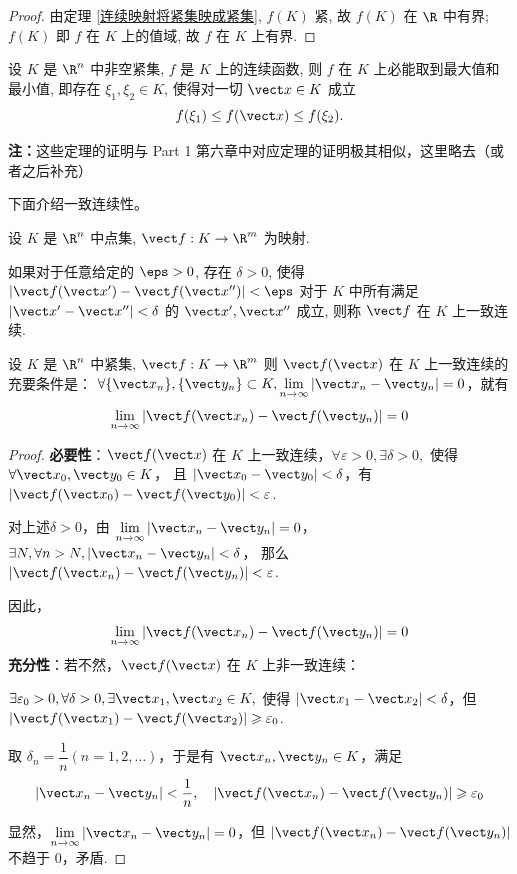 \begin{proof}
	由定理 \ref{连续映射将紧集映成紧集}, $f(K)$ 紧, 故 $f(K)$ 在 $\R$ 中有界; $f(K)$ 即 $f$ 在 $K$ 上的值域, 故 $f$ 在 $K$ 上有界.
\end{proof}

\begin{theorem}[最值定理]
	设 $K$ 是 $\R^n$ 中非空紧集, $f$ 是 $K$ 上的连续函数, 则 $f$ 在 $K$ 上必能取到最大值和最小值, 即存在 $\xi_1, \xi_2 \in K$, 使得对一切 $\vect x \in K$ 成立
	\[
	f(\xi_1) \le f(\vect x) \le f(\xi_2).
	\]
\end{theorem}
\textbf{注：}这些定理的证明与 Part 1 第六章中对应定理的证明极其相似，这里略去（或者之后补充）

下面介绍一致连续性。
\begin{definition}
	设 $K$ 是 $\R^n$ 中点集, $\vect f: K \to \R^m$ 为映射. 
	
	如果对于任意给定的 $\eps > 0$, 存在 $\delta > 0$, 使得 $|\vect f(\vect x') - \vect f(\vect x'')| < \eps$ 对于 $K$ 中所有满足 $|\vect x' - \vect x''| < \delta$ 的 $\vect x', \vect x''$ 成立, 则称 $\vect f$ 在 $K$ 上一致连续.
\end{definition}
\begin{lemma}
	设 $K$ 是 $\R^n$ 中紧集, $\vect f: K \to \R^m$ 则 \( \vect f(\vect x) \) 在 \(K\) 上一致连续的充要条件是：
	\(\forall \{\vect x_n\}, \{\vect y_n\} \subset K, \lim\limits_{n \to \infty} |\vect x_n - \vect y_n| = 0\)，就有
	\[ \lim_{n \to \infty} |\vect f(\vect x_n) - \vect f(\vect y_n) |= 0 \]
	
	
\end{lemma}
\begin{proof}
	\textbf{必要性}：\( \vect f(\vect x) \) 在 \(K\)  上一致连续，\(\forall \varepsilon > 0, \exists \delta > 0, \) 使得 \(\forall \vect x_0, \vect y_0 \in K\)，
	且 \(|\vect x_0 - \vect y_0| < \delta\)，有 \(|\vect f(\vect x_0) - \vect f(\vect y_0)| < \varepsilon\).
	
	对上述\(\delta > 0\)，由 \(\lim\limits_{n \to \infty} |\vect x_n - \vect y_n|= 0\)，\(\exists N, \forall n > N, |\vect x_n - \vect y_n| < \delta\)，
	那么 \( |\vect  f(\vect x_n) -\vect f(\vect y_n)| < \varepsilon\).
	
	因此，\[\lim_{n \to \infty} |\vect  f(\vect x_n) -\vect f(\vect y_n)| = 0\]
\textbf{	充分性}：若不然，\(\vect f(\vect x)\) 在 \(K\) 上非一致连续：
	
	\(\exists \varepsilon_0 > 0, \forall \delta > 0, \exists \vect x_1, \vect x_2 \in K, \) 使得 \(|\vect x_1 - \vect x_2| < \delta\)，但 \(|\vect f(\vect x_1) - \vect f(\vect x_2)| \geqslant \varepsilon_0\).
	
	取 \(\delta_n = \dfrac{1}{n} (n = 1, 2, \dots)\)，于是有 \(\vect x_n, \vect y_n \in K\)，满足
	\[ |\vect x_n - \vect y_n| < \frac{1}{n}, \quad  |\vect  f(\vect x_n) -\vect f(\vect y_n)| \geqslant \varepsilon_0 \]
	
	显然，\(\lim\limits_{n \to \infty} |\vect x_n - \vect y_n| = 0\)，但 $|\vect f(\vect x_n)-\vect f(\vect y_n)|$ 不趋于 $0$，矛盾.
	
\end{proof}
